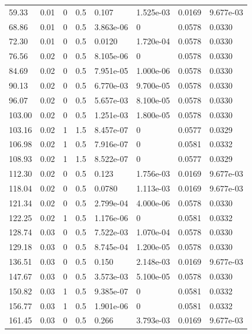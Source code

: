 \documentclass[preview]{standalone}
\begin{document}
{{\begin{tabular}{L{1.2cm}C{1.2cm} C{0.3cm}C{0.5cm} C{1.4cm}C{1.4cm} C{1.4cm}C{1.4cm}}
  59.33  &  0.01  & 0     & 0.5 &  0.107  & 1.525e-03  & 0.0169 &  9.677e-03   \\ 
  68.86  &  0.01  & 0     & 0.5 &  3.863e-06  & 0  & 0.0578 &  0.0330   \\ 
  72.30  &  0.01  & 0     & 0.5 &  0.0120  & 1.720e-04  & 0.0578 &  0.0330   \\ 
  76.56  &  0.02  & 0     & 0.5 &  8.105e-06  & 0  & 0.0578 &  0.0330   \\ 
  84.69  &  0.02  & 0     & 0.5 &  7.951e-05  & 1.000e-06  & 0.0578 &  0.0330   \\ 
  90.13  &  0.02  & 0     & 0.5 &  6.770e-03  & 9.700e-05  & 0.0578 &  0.0330   \\ 
  96.07  &  0.02  & 0     & 0.5 &  5.657e-03  & 8.100e-05  & 0.0578 &  0.0330   \\ 
  103.00  &  0.02  & 0     & 0.5 &  1.251e-03  & 1.800e-05  & 0.0578 &  0.0330   \\ 
  103.16  &  0.02  & 1     & 1.5 &  8.457e-07  & 0  & 0.0577 &  0.0329   \\ 
  106.98  &  0.02  & 1     & 0.5 &  7.916e-07  & 0  & 0.0581 &  0.0332   \\ 
  108.93  &  0.02  & 1     & 1.5 &  8.522e-07  & 0  & 0.0577 &  0.0329   \\ 
  112.30  &  0.02  & 0     & 0.5 &  0.123  & 1.756e-03  & 0.0169 &  9.677e-03   \\ 
  118.04  &  0.02  & 0     & 0.5 &  0.0780  & 1.113e-03  & 0.0169 &  9.677e-03   \\ 
  121.34  &  0.02  & 0     & 0.5 &  2.799e-04  & 4.000e-06  & 0.0578 &  0.0330   \\ 
  122.25  &  0.02  & 1     & 0.5 &  1.176e-06  & 0  & 0.0581 &  0.0332   \\ 
  128.74  &  0.03  & 0     & 0.5 &  7.522e-03  & 1.070e-04  & 0.0578 &  0.0330   \\ 
  129.18  &  0.03  & 0     & 0.5 &  8.745e-04  & 1.200e-05  & 0.0578 &  0.0330   \\ 
  136.51  &  0.03  & 0     & 0.5 &  0.150  & 2.148e-03  & 0.0169 &  9.677e-03   \\ 
  147.67  &  0.03  & 0     & 0.5 &  3.573e-03  & 5.100e-05  & 0.0578 &  0.0330   \\ 
  150.82  &  0.03  & 1     & 0.5 &  9.385e-07  & 0  & 0.0581 &  0.0332   \\ 
  156.77  &  0.03  & 1     & 0.5 &  1.901e-06  & 0  & 0.0581 &  0.0332   \\ 
  161.45  &  0.03  & 0     & 0.5 &  0.266  & 3.793e-03  & 0.0169 &  9.677e-03   \\ 

\end{tabular}}}
\end{document}
